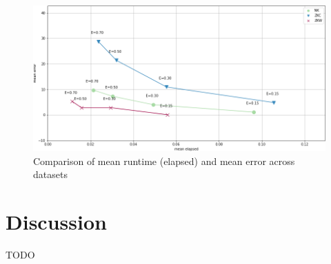 \documentclass[a4paper,10pt]{article}
\begin{document}
\begin{figure}[!htb]
	\centering
  	\includegraphics[width=\textwidth]{images/fptas_comparison.png}
	\caption{Comparison of mean runtime (elapsed) and mean error across datasets}
	\label{fptas_comparison}
\end{figure}


\section{Discussion}
TODO
\end{document}
